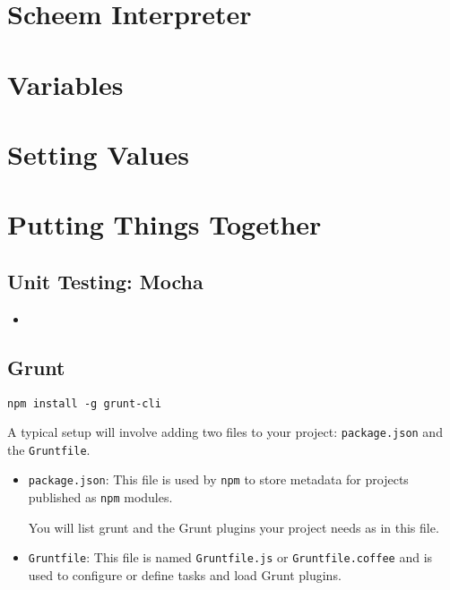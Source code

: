 
\section{Scheem Interpreter}

\section{Variables}


\section{Setting Values}


\section{Putting Things Together}

\subsection{Unit Testing: Mocha}
\label{subsection:mocha}




\begin{itemize}
\item
{}
\end{itemize}


\subsection{Grunt}


\begin{verbatim}
npm install -g grunt-cli
\end{verbatim}

A typical setup will involve adding two files to your project: \verb|package.json| and the 
\verb|Gruntfile|.

\begin{itemize}
\item
\verb|package.json|: This file is used by \verb|npm| 
to store metadata for projects published as \verb|npm| modules. 

You will list grunt and the Grunt plugins your project needs as  
in this file.

\item
\verb|Gruntfile|: This file is named \verb|Gruntfile.js| or \verb|Gruntfile.coffee| and is used to configure or define tasks and load Grunt plugins.
\end{itemize}

